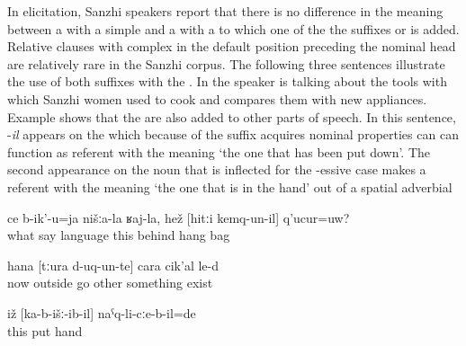 In elicitation, Sanzhi speakers report that there is no difference in the meaning between a  with a simple  and a  with a  to which one of the the suffixes  or  is added. Relative clauses with complex  in the default position preceding the nominal head are relatively rare in the Sanzhi corpus. The following three sentences  illustrate the use of both suffixes with the . In  the speaker is talking about the tools with which Sanzhi women used to cook and compares them with new appliances. Example  shows that the  are also added to other parts of speech. In this sentence, -\textit{il} appears on the  which because of the suffix acquires nominal properties can can function as referent with the meaning `the one that has been put down'. The second appearance on the noun that is inflected for the -essive case makes a referent with the meaning `the one that is in the hand' out of a spatial adverbial
%
\begin{exe}
	\ex	\label{ex:‎How do we call in our language the back that hangs behind his back?}
	\gll	ce	b-ik'-u=ja	nišːa-la	ʁaj-la,	hež	[hitːi	kemq-un-il]	q'ucur=uw?\\
		what	say		language	this	behind	hang		bag\\
	\glt	{}

	\ex	\label{ex:‎‎‎Now there are other things that appeared (lit. went out)}
	\gll	hana	[tːura	d-uq-un-te]	cara	cik'al	le-d\\
		now	outside	go 	other	something	exist\\
	\glt	{}
	
	\ex	\label{ex:The one that was in the hand had been put down}
\gll	iž	[ka-b-išː-ib-il]	naˁq-li-cːe-b-il=de\\
	this	put	hand\\
	\glt	{}
\end{exe}


